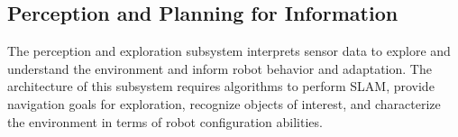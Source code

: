 \documentclass[conference]{IEEEtran}
\begin{document}
\subsection{Perception and Planning for Information}
\label{sec:exploration}
%


The perception and exploration subsystem interprets sensor data to explore and understand the environment and inform robot behavior and adaptation. The architecture of this subsystem requires algorithms to perform SLAM, provide navigation goals for exploration, recognize objects of interest, and characterize the environment in terms of robot configuration abilities.
\end{document}
